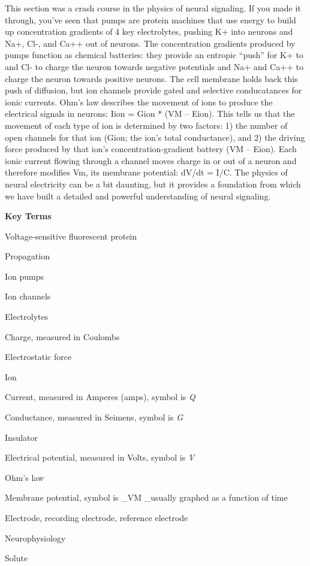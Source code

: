 \documentclass[
]{book}
\begin{document}
This section was a crash course in the physics of neural signaling. If you made it through, you've seen that pumps are protein machines that use energy to build up concentration gradients of 4 key electrolytes, pushing K+ into neurons and Na+, Cl-, and Ca++ out of neurons. The concentration gradients produced by pumps function as chemical batteries: they provide an entropic ``push'' for K+ to and Cl- to charge the neuron towards negative potentials and Na+ and Ca++ to charge the neuron towards positive neurons. The cell membrane holds back this push of diffusion, but ion channels provide gated and selective conducatances for ionic currents. Ohm's law describes the movement of ions to produce the electrical signals in neurons: Iion = Gion * (VM -- Eion). This tells us that the movement of each type of ion is determined by two factors: 1) the number of open channels for that ion (Gion; the ion's total conductance), and 2) the driving force produced by that ion's concentration-gradient battery (VM -- Eion). Each ionic current flowing through a channel moves charge in or out of a neuron and therefore modifies Vm, its membrane potential: dV/dt = I/C. The physics of neural electricity can be a bit daunting, but it provides a foundation from which we have built a detailed and powerful understanding of neural signaling.

\textbf{Key Terms}

Voltage-sensitive fluorescent protein

Propagation

Ion pumps

Ion channels

Electrolytes

Charge, measured in Coulombs

Electrostatic force

Ion

Current, measured in Amperes (amps), symbol is \emph{Q}

Conductance, measured in Seimens, symbol is \emph{G}

Insulator

Electrical potential, measured in Volts, symbol is \emph{V}

Ohm's law

Membrane potential, symbol is \_VM \_usually graphed as a function of time

Electrode, recording electrode, reference electrode

Neurophysiology

Solute
\end{document}
